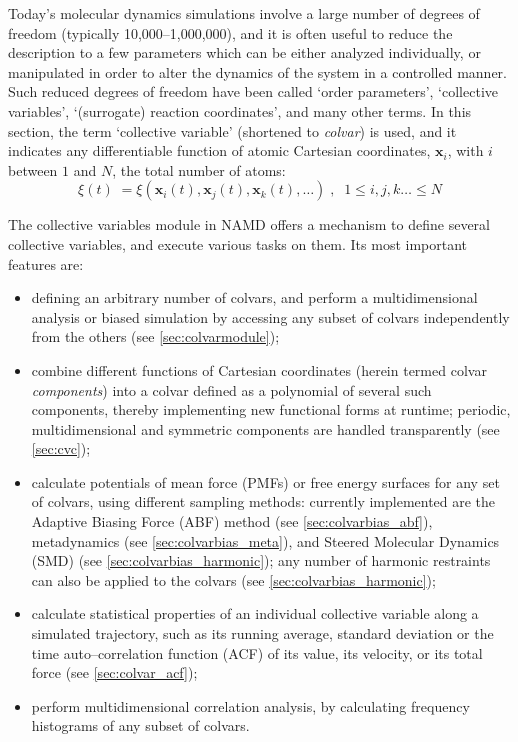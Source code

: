 

Today's molecular dynamics simulations involve a large number of
degrees of freedom (typically 10,000--1,000,000), and it is often
useful to reduce the description to a few parameters which can be
either analyzed individually, or manipulated in order to alter the
dynamics of the system in a controlled manner.  Such reduced degrees
of freedom have been called `order parameters', `collective
variables', `(surrogate) reaction coordinates', and many other terms.
In this section, the term `collective variable' (shortened to
\textit{colvar}) is used, and it indicates any differentiable function
of atomic Cartesian coordinates, $\bm{x}_{i}$, with $i$ between
$1$ and $N$, the total number of atoms:
\begin{equation} 
  \label{eq:colvar_basic}
  \xi(t) \; = \xi\left(\bm{x}_{i}(t), \bm{x}_{j}(t), \bm{x}_{k}(t),
  \ldots \right)\;, \;\; 1 \leq i,j,k\ldots \leq N
\end{equation}

The collective variables module in NAMD offers a mechanism to define
several collective variables, and execute various tasks on them.
Its most important features are:
\begin{itemize}
\item defining an arbitrary number of colvars, and perform a
  multidimensional analysis or biased simulation by accessing any
  subset of colvars independently from the others (see
  \ref{sec:colvarmodule});
\item combine different functions of Cartesian coordinates
  (herein termed colvar \emph{components}) into a colvar
  defined as a polynomial of several such components, thereby
  implementing new functional forms at runtime; periodic,
  multidimensional and symmetric components are handled transparently
  (see \ref{sec:cvc});
\item calculate potentials of mean force (PMFs) or free energy
  surfaces for any set of colvars, using different sampling methods:
  currently implemented are the Adaptive Biasing Force (ABF)
  method (see \ref{sec:colvarbias_abf}), metadynamics (see
  \ref{sec:colvarbias_meta}), and Steered Molecular Dynamics (SMD)
  (see \ref{sec:colvarbias_harmonic}); any number of harmonic
  restraints can also be applied to the colvars (see
  \ref{sec:colvarbias_harmonic});
\item calculate statistical properties of an individual collective
  variable along a simulated trajectory, such as its running average,
  standard deviation or the time auto--correlation function (ACF)
  of its value, its velocity, or its total force (see
  \ref{sec:colvar_acf});
\item perform multidimensional correlation analysis, by calculating
  frequency histograms of any subset of colvars.
\end{itemize}

